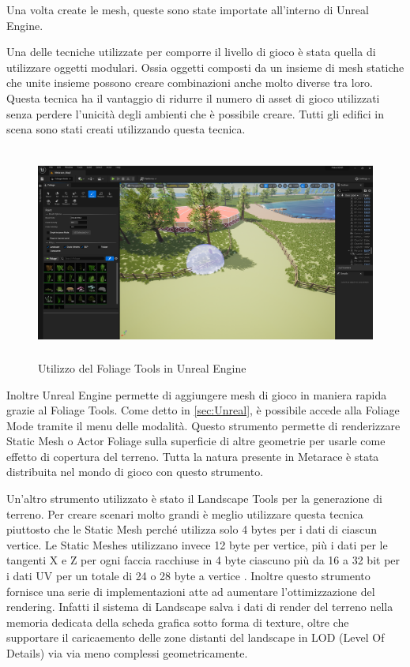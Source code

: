     Una volta create le mesh, queste sono state importate all'interno di Unreal Engine.
    
    Una delle tecniche utilizzate per comporre il livello di gioco è stata quella di utilizzare oggetti modulari.
    Ossia oggetti composti da un insieme di mesh statiche che unite insieme possono creare combinazioni anche molto diverse tra loro.
    Questa tecnica ha il vantaggio di ridurre il numero di asset di gioco utilizzati senza perdere l'unicità degli ambienti che è possibile creare.
    Tutti gli edifici in scena sono stati creati utilizzando questa tecnica.
    
    \begin{figure}[t]
        \centering
        \includegraphics[height= 7cm]{figure/UnrealEngine5Editor.png}
        \caption{Utilizzo del Foliage Tools in Unreal Engine}
    \end{figure}

    Inoltre Unreal Engine permette di aggiungere mesh di gioco in maniera rapida grazie al Foliage Tools.
    Come detto in \ref{sec:Unreal}, è possibile accede alla Foliage Mode tramite il menu delle modalità.
    Questo strumento permette di renderizzare Static Mesh o Actor Foliage sulla superficie di altre geometrie per usarle come effetto di copertura del terreno.
    Tutta la natura presente in Metarace è stata distribuita nel mondo di gioco con questo strumento.

    Un'altro strumento utilizzato è stato il Landscape Tools per la generazione di terreno.
    Per creare scenari molto grandi è meglio utilizzare questa tecnica piuttosto che le Static Mesh perché utilizza solo 4 bytes per i dati di ciascun vertice.
    Le Static Meshes utilizzano invece 12 byte per vertice, più i dati per le tangenti X e Z per ogni faccia racchiuse in 4 byte ciascuno più  da 16 a 32 bit per i dati UV per un totale di 24 o 28 byte a vertice \cite{ULandscape}.
    Inoltre questo strumento fornisce una serie di implementazioni atte ad aumentare l'ottimizzazione del rendering.
    Infatti il sistema di Landscape salva i dati di render del terreno nella memoria dedicata della scheda grafica sotto forma di texture, oltre che supportare il caricaemento delle zone distanti del landscape in LOD (Level Of Details) via via meno complessi geometricamente.

